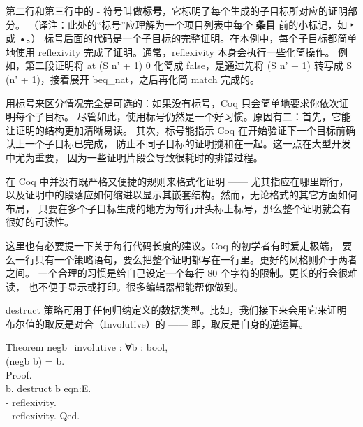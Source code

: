 \documentclass[utf8]{ctexart}
\begin{document}
第二行和第三行中的 {-}
符号叫做\textbf{标号}，它标明了每个生成的子目标所对应的证明部分。
（译注：此处的``标号''应理解为一个项目列表中每个 \textbf{条目}
前的小标记，如 ‣ 或 •。）
标号后面的代码是一个子目标的完整证明。在本例中，每个子目标都简单地使用
{{reflexivity}} 完成了证明。通常，{{reflexivity}}
本身会执行一些化简操作。 例如，第二段证明将 {{at}} {({S}} {{n'}} {+}
{1)} {0} 化简成 {{false}}，是通过先将 {({S}} {{n'}} {+} {1)} 转写成
{{S}} {({n'}} {+} {1)}，接着展开 {{beq\_nat}}，之后再化简 {{match}}
完成的。

用标号来区分情况完全是可选的：如果没有标号，Coq
只会简单地要求你依次证明每个子目标。
尽管如此，使用标号仍然是一个好习惯。原因有二：首先，它能让证明的结构更加清晰易读。
其次，标号能指示 Coq 在开始验证下一个目标前确认上一个子目标已完成，
防止不同子目标的证明搅和在一起。这一点在大型开发中尤为重要，
因为一些证明片段会导致很耗时的排错过程。

在 Coq 中并没有既严格又便捷的规则来格式化证明 ------
尤其指应在哪里断行，
以及证明中的段落应如何缩进以显示其嵌套结构。然而，无论格式的其它方面如何布局，
只要在多个子目标生成的地方为每行开头标上标号，那么整个证明就会有很好的可读性。

这里也有必要提一下关于每行代码长度的建议。Coq 的初学者有时爱走极端，
要么一行只有一个策略语句，要么把整个证明都写在一行里。更好的风格则介于两者之间。
一个合理的习惯是给自己设定一个每行 80 个字符的限制。更长的行会很难读，
也不便于显示或打印。很多编辑器都能帮你做到。

{{destruct}}
策略可用于任何归纳定义的数据类型。比如，我们接下来会用它来证明
布尔值的取反是对合（Involutive）的 ------ 即，取反是自身的逆运算。

{Theorem} {negb\_involutive} : {∀}{b} : {bool},\\
\hspace*{0.333em}\hspace*{0.333em}{negb} ({negb} {b}) = {b}.\\
{Proof}.\\
\hspace*{0.333em}\hspace*{0.333em}{intros} {b}. {destruct} {b}
{eqn}:{E}.\\
\hspace*{0.333em}\hspace*{0.333em}- {reflexivity}.\\
\hspace*{0.333em}\hspace*{0.333em}- {reflexivity}. {Qed}.\\
\end{document}
